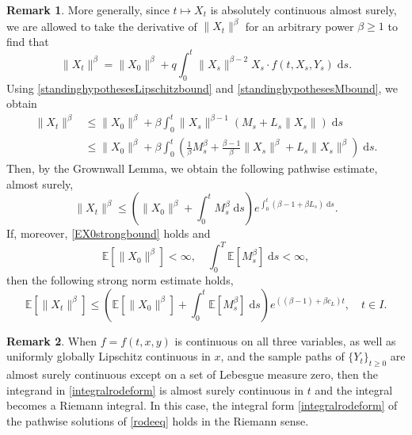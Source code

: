 \documentclass[reqno,12pt]{amsart}
\theoremstyle{plain} %
\theoremstyle{definition} %
\newtheorem{remark}{Remark}[section]
\begin{document}
\begin{remark}
    More generally, since $t\mapsto X_t$ is absolutely continuous almost surely, we are allowed to take the derivative of $\|X_t\|^\beta$ for an arbitrary power $\beta \geq 1$ to find that
    \[
        \|X_t\|^\beta = \|X_0\|^\beta + q\int_0^t \|X_s\|^{\beta-2}X_s \cdot f(t, X_s, Y_s)\;\mathrm{d}s.
    \]
    Using \eqref{standinghypothesesLipschitzbound} and \eqref{standinghypothesesMbound}, we obtain
    \begin{align*}
        \|X_t\|^\beta & \leq \|X_0\|^\beta + \beta\int_0^t \|X_s\|^{\beta-1} \left(M_s + L_s \|X_s\|\right)\;\mathrm{d}s \\
        & \leq \|X_0\|^\beta + \beta\int_0^t \left(\frac{1}{\beta}M_s^\beta + \frac{\beta-1}{\beta}\|X_s\|^\beta + L_s \|X_s\|^\beta\right)\;\mathrm{d}s.
    \end{align*}
    Then, by the Grownwall Lemma, we obtain the following pathwise estimate, almost surely,
    \begin{equation}
        \label{XtboundLXMtbeta}
        \|X_t\|^\beta \leq \left(\|X_0\|^\beta + \int_0^t M_s^\beta \;\mathrm{d}s\right) e^{\int_0^t \left(\beta - 1 + \beta L_s\right) \;\mathrm{d}s}.
    \end{equation}
    If, moreover, \eqref{EX0strongbound} holds and 
    \begin{equation}
        \label{EX0Mtstrongboundbeta}
        \mathbb{E}[\|X_0\|^\beta] < \infty, \quad
        \int_0^T \mathbb{E}[M_s^\beta] \;\mathrm{d}s < \infty,
    \end{equation}
    then the following strong norm estimate holds,
    \begin{equation}
        \label{EXtstrongboundbeta}
        \mathbb{E}[\|X_t\|^\beta] \leq \left(\mathbb{E}[\|X_0\|^\beta] + \int_0^t \mathbb{E}[M_s^\beta]\;\mathrm{d}s\right) e^{((\beta - 1) + \beta c_L) t}, \quad t\in I.
    \end{equation}
\end{remark}

\begin{remark}
    When $f=f(t, x, y)$ is continuous on all three variables, as well as uniformly globally Lipschitz continuous in $x$, and the sample paths of $\{Y_t\}_{t\geq 0}$ are almost surely continuous except on a set of Lebesgue measure zero, then the integrand in \eqref{integralrodeform} is almost surely continuous in $t$ and the integral becomes a Riemann integral. In this case, the integral form \eqref{integralrodeform} of the pathwise solutions of \eqref{rodeeq} holds in the Riemann sense.
\end{remark}
\end{document}

